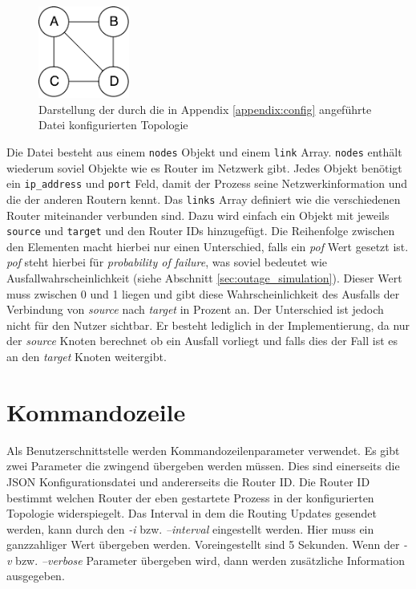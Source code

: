 \documentclass[a4paper,ngerman]{article}
\begin{document}
\begin{figure}[H]
    \centering
    \includegraphics[width=3cm,keepaspectratio]{topology2}
    \caption{Darstellung der durch die in Appendix \vref{appendix:config} angeführte Datei konfigurierten Topologie}
    \label{fig:topology}
\end{figure}

Die Datei besteht aus einem \lstinline{nodes} Objekt und einem \lstinline{link} Array. \lstinline{nodes} enthält wiederum soviel Objekte wie es Router im Netzwerk gibt. Jedes Objekt benötigt ein \lstinline{ip_address} und \lstinline{port} Feld, damit der Prozess seine Netzwerkinformation und die der anderen Routern kennt. Das \lstinline{links} Array definiert wie die verschiedenen Router miteinander verbunden sind. Dazu wird einfach ein Objekt mit jeweils \lstinline{source} und \lstinline{target} und den Router IDs hinzugefügt. Die Reihenfolge zwischen den Elementen macht hierbei nur einen Unterschied, falls ein \textit{pof} Wert gesetzt ist. \textit{pof} steht hierbei für \textit{probability of failure}, was soviel bedeutet wie Ausfallwahrscheinlichkeit (siehe Abschnitt \vref{sec:outage_simulation}). Dieser Wert muss zwischen 0 und 1 liegen und gibt diese Wahrscheinlichkeit des Ausfalls der Verbindung von \textit{source} nach \textit{target} in Prozent an. Der Unterschied ist jedoch nicht für den Nutzer sichtbar. Er besteht lediglich in der Implementierung, da nur der \textit{source} Knoten berechnet ob ein Ausfall vorliegt und falls dies der Fall ist es an den \textit{target} Knoten weitergibt.

\section{Kommandozeile}

Als Benutzerschnittstelle werden Kommandozeilenparameter verwendet. Es gibt zwei Parameter die zwingend übergeben werden müssen. Dies sind einerseits die JSON Konfigurationsdatei und andererseits die Router ID. Die Router ID bestimmt welchen Router der eben gestartete Prozess in der konfigurierten Topologie widerspiegelt. Das Interval in dem die Routing Updates gesendet werden, kann durch den \textit{-i} bzw. \textit{--interval} eingestellt werden. Hier muss ein ganzzahliger Wert übergeben werden. Voreingestellt sind 5 Sekunden. Wenn der \textit{-v} bzw. \textit{--verbose} Parameter übergeben wird, dann werden zusätzliche Information ausgegeben.
\end{document}
